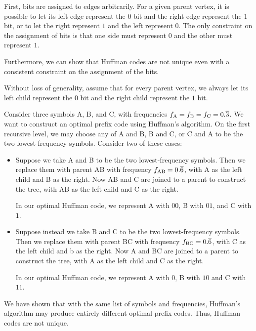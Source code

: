 \begin{enumerate}
\begin{solution}
First, bits are assigned to edges arbitrarily. For a given parent vertex, it is possible to let its left edge represent the $0$ bit and the right edge represent the $1$ bit, or to let the right represent $1$ and the left represent $0$. The only constraint on the assignment of bits is that one side must represent $0$ and the other must represent $1$. 

Furthermore, we can show that Huffman codes are not unique even with a consistent constraint on the assignment of the bits. 

Without loss of generality, assume that for every parent vertex, we always let its left child represent the $0$ bit and the right child represent the $1$ bit.

Consider three symbols A, B, and C, with frequencies $f_{\rm A}=f_{\rm B}=f_{\rm C}=0.\overline{3}$. We want to construct an optimal prefix code using Huffman's algorithm. On the first recursive level, we may choose any of A and B, B and C, or C and A to be the two lowest-frequency symbols. Consider two of these cases:
\begin{itemize}
\item Suppose we take A and B to be the two lowest-frequency symbols. Then we replace them with parent AB with frequency $f_{\rm AB}=0.\overline{6}$, with A as the left child and B as the right. Now AB and C are joined to a parent to construct the tree, with AB as the left child and C as the right.

In our optimal Huffman code, we represent A with $00$, B with $01$, and C with $1$.

\item Suppose instead we take B and C to be the two lowest-frequency symbols. Then we replace them with parent BC with frequency $f_{\rm BC}=0.\overline{6}$, with C as the left child and b as the right. Now A and BC are joined to a parent to construct the tree, with A as the left child and C as the right.

In our optimal Huffman code, we represent A with $0$, B with $10$ and C with $11$.
\end{itemize}
We have shown that with the same list of symbols and frequencies, Huffman's algorithm may produce entirely different optimal prefix codes. Thus, Huffman codes are not unique.
\end{solution}
\end{enumerate}
\newpage
